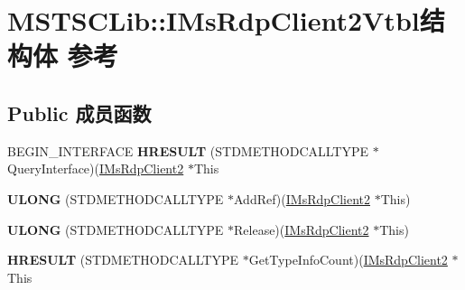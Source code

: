 \hypertarget{struct_m_s_t_s_c_lib_1_1_i_ms_rdp_client2_vtbl}{}\section{M\+S\+T\+S\+C\+Lib\+:\+:I\+Ms\+Rdp\+Client2\+Vtbl结构体 参考}
\label{struct_m_s_t_s_c_lib_1_1_i_ms_rdp_client2_vtbl}
\subsection*{Public 成员函数}
\begin{DoxyCompactItemize}
\item 
\mbox{\label{struct_m_s_t_s_c_lib_1_1_i_ms_rdp_client2_vtbl_a3ef5e344dd634763b2f4bbbffdc80ed2}} 
B\+E\+G\+I\+N\+\_\+\+I\+N\+T\+E\+R\+F\+A\+CE {\bfseries H\+R\+E\+S\+U\+LT} (S\+T\+D\+M\+E\+T\+H\+O\+D\+C\+A\+L\+L\+T\+Y\+PE $\ast$Query\+Interface)(\hyperlink{interface_m_s_t_s_c_lib_1_1_i_ms_rdp_client2}{I\+Ms\+Rdp\+Client2} $\ast$This
\item 
\mbox{\label{struct_m_s_t_s_c_lib_1_1_i_ms_rdp_client2_vtbl_ae925b80b94c1c361a62eb6875326a1ab}} 
{\bfseries U\+L\+O\+NG} (S\+T\+D\+M\+E\+T\+H\+O\+D\+C\+A\+L\+L\+T\+Y\+PE $\ast$Add\+Ref)(\hyperlink{interface_m_s_t_s_c_lib_1_1_i_ms_rdp_client2}{I\+Ms\+Rdp\+Client2} $\ast$This)
\item 
\mbox{\label{struct_m_s_t_s_c_lib_1_1_i_ms_rdp_client2_vtbl_aea409c55cc9798f6b3329d9813b595aa}} 
{\bfseries U\+L\+O\+NG} (S\+T\+D\+M\+E\+T\+H\+O\+D\+C\+A\+L\+L\+T\+Y\+PE $\ast$Release)(\hyperlink{interface_m_s_t_s_c_lib_1_1_i_ms_rdp_client2}{I\+Ms\+Rdp\+Client2} $\ast$This)
\item 
\mbox{\label{struct_m_s_t_s_c_lib_1_1_i_ms_rdp_client2_vtbl_a5e69c4a58e7992bb782796255e922fce}} 
{\bfseries H\+R\+E\+S\+U\+LT} (S\+T\+D\+M\+E\+T\+H\+O\+D\+C\+A\+L\+L\+T\+Y\+PE $\ast$Get\+Type\+Info\+Count)(\hyperlink{interface_m_s_t_s_c_lib_1_1_i_ms_rdp_client2}{I\+Ms\+Rdp\+Client2} $\ast$This
\item 
\mbox{\label{struct_m_s_t_s_c_lib_1_1_i_ms_rdp_client2_vtbl_a45a914a6a545835bdbfe81ebf252a653}} 

\end{DoxyCompactItemize}
